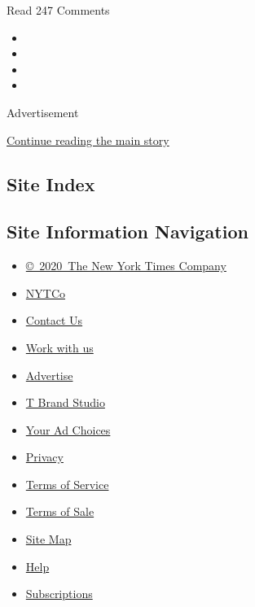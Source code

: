 Read 247 Comments

\begin{itemize}
\item
\item
\item
\item
\end{itemize}

Advertisement

\protect\hyperlink{after-bottom}{Continue reading the main story}

\hypertarget{site-index}{%
\subsection{Site Index}\label{site-index}}

\hypertarget{site-information-navigation}{%
\subsection{Site Information
Navigation}\label{site-information-navigation}}

\begin{itemize}
\tightlist
\item
  \href{https://help.nytimes3xbfgragh.onion/hc/en-us/articles/115014792127-Copyright-notice}{©~2020~The
  New York Times Company}
\end{itemize}

\begin{itemize}
\tightlist
\item
  \href{https://www.nytco.com/}{NYTCo}
\item
  \href{https://help.nytimes3xbfgragh.onion/hc/en-us/articles/115015385887-Contact-Us}{Contact
  Us}
\item
  \href{https://www.nytco.com/careers/}{Work with us}
\item
  \href{https://nytmediakit.com/}{Advertise}
\item
  \href{http://www.tbrandstudio.com/}{T Brand Studio}
\item
  \href{https://www.nytimes3xbfgragh.onion/privacy/cookie-policy\#how-do-i-manage-trackers}{Your
  Ad Choices}
\item
  \href{https://www.nytimes3xbfgragh.onion/privacy}{Privacy}
\item
  \href{https://help.nytimes3xbfgragh.onion/hc/en-us/articles/115014893428-Terms-of-service}{Terms
  of Service}
\item
  \href{https://help.nytimes3xbfgragh.onion/hc/en-us/articles/115014893968-Terms-of-sale}{Terms
  of Sale}
\item
  \href{https://spiderbites.nytimes3xbfgragh.onion}{Site Map}
\item
  \href{https://help.nytimes3xbfgragh.onion/hc/en-us}{Help}
\item
  \href{https://www.nytimes3xbfgragh.onion/subscription?campaignId=37WXW}{Subscriptions}
\end{itemize}
